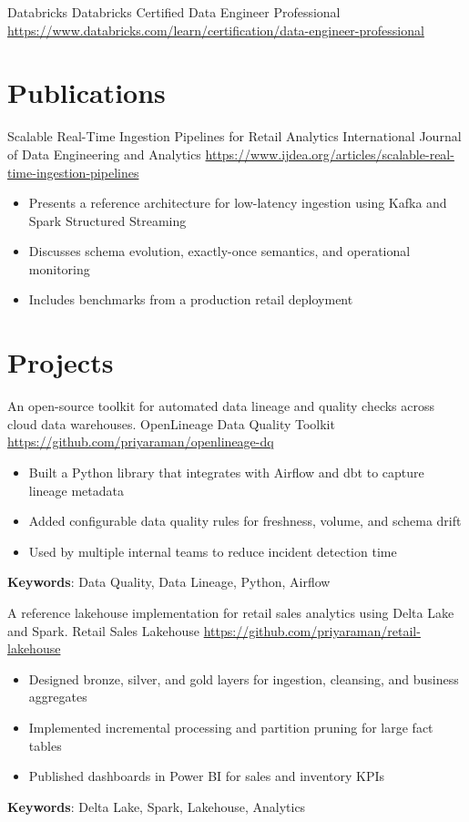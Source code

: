 \documentclass[a4paper, serif, 10pt]{moderncv}
\begin{document}
        {Databricks}
        {Databricks Certified Data Engineer Professional}
        {\url{https://www.databricks.com/learn/certification/data-engineer-professional}}
        {}
        {}
\section{Publications}

        {Scalable Real-Time Ingestion Pipelines for Retail Analytics}
        {International Journal of Data Engineering and Analytics}
        {\url{https://www.ijdea.org/articles/scalable-real-time-ingestion-pipelines}}
        {}
        {\begin{itemize}
\item Presents a reference architecture for low-latency ingestion using Kafka and Spark Structured Streaming
\item Discusses schema evolution, exactly-once semantics, and operational monitoring
\item Includes benchmarks from a production retail deployment
\end{itemize}}
\section{Projects}

        {An open-source toolkit for automated data lineage and quality checks across cloud data warehouses.}
        {OpenLineage Data Quality Toolkit}
        {\url{https://github.com/priyaraman/openlineage-dq}}
        {}
        {\begin{itemize}
\item Built a Python library that integrates with Airflow and dbt to capture lineage metadata
\item Added configurable data quality rules for freshness, volume, and schema drift
\item Used by multiple internal teams to reduce incident detection time
\end{itemize}
\textbf{Keywords}: Data Quality, Data Lineage, Python, Airflow}

        {A reference lakehouse implementation for retail sales analytics using Delta Lake and Spark.}
        {Retail Sales Lakehouse}
        {\url{https://github.com/priyaraman/retail-lakehouse}}
        {}
        {\begin{itemize}
\item Designed bronze, silver, and gold layers for ingestion, cleansing, and business aggregates
\item Implemented incremental processing and partition pruning for large fact tables
\item Published dashboards in Power BI for sales and inventory KPIs
\end{itemize}
\textbf{Keywords}: Delta Lake, Spark, Lakehouse, Analytics}
\end{document}

